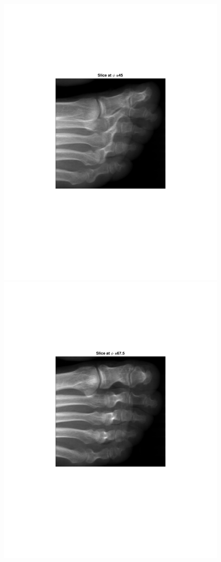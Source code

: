 \documentclass{UCF_ETD}
\begin{document}
\begin{figure}[H]
\begin{center}
\includegraphics[scale=0.5]{FVR/FootSlice45} 
\includegraphics[scale=0.5]{FVR/FootSlice68}

\end{center}
\end{figure}
\end{document}
